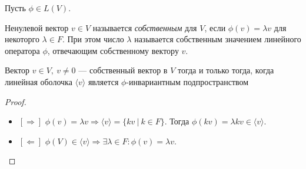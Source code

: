 Пусть $\phi\in L(V)$.

\begin{Def}
    Ненулевой вектор $v\in V$ называется \textit{собственным} для $V$, если $\phi(v) = \lambda v$ для некоторго $\lambda \in F$. При этом число $\lambda$ называется собственным значением линейного оператора $\phi$, отвечающим собственному вектору $v$.
\end{Def}

\begin{Suggestion}
    Вектор $v \in V,\ v \neq 0$ --- собственный вектор в $V$ тогда и только тогда, когда линейная оболочка $\langle v \rangle$ является $\phi$-инвариантным подпространством
\end{Suggestion}

\begin{proof}\
\begin{itemize}
\item $[\Rightarrow]$ $\phi(v) = \lambda v \Rightarrow \langle v \rangle = \{kv\ |\ k\in F\}$. Тогда $\phi(kv) = \lambda k v \in \langle v \rangle.$

\item $[\Leftarrow]$ $\phi(V) \in \langle v \rangle \Rightarrow \exists \lambda \in F\colon \phi(v) = \lambda v$.
\end{itemize}
\end{proof}

